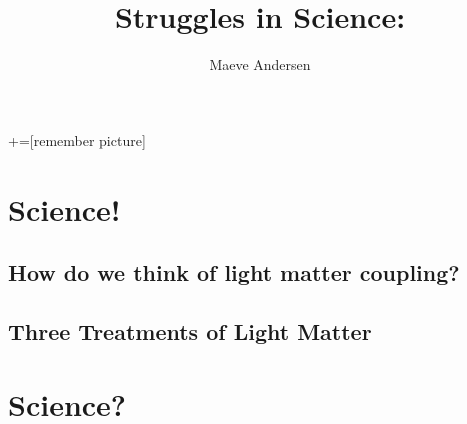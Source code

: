 \documentclass{beamer}
\title{Struggles in Science:}
\author{Maeve Andersen}
\begin{document}
+=[remember picture]

\everymath{\displaystyle}

\maketitle

\frame{\tableofcontents}
\section{Science!}
\subsection{How do we think of light matter coupling?}
\subsection{Three Treatments of Light Matter}
\section{Science?}

\end{document}
